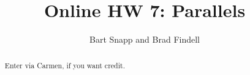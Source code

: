 \documentclass[handout,space,nooutcomes]{xourse}
\title{Online HW 7: Parallels}
\author{Bart Snapp and Brad Findell}
\begin{document}
\begin{abstract}
Enter via Carmen, if you want credit.  
\end{abstract}
\maketitle

{}
\end{document}
